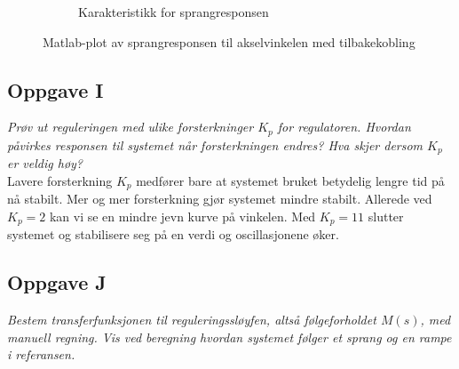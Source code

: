 \begin{figure}[h]
\begin{subfigure}[a]{0.450\textwidth}
		\caption{}{Karakteristikk for sprangresponsen}
		\label{fig:step_stable_char}
	\end{subfigure}
	\caption{Matlab-plot av sprangresponsen til akselvinkelen med tilbakekobling}
	\label{fig:step_stable}
\end{figure}

\subsection{Oppgave I}

\emph{Prøv ut reguleringen med ulike forsterkninger $K_p$ for regulatoren. Hvordan påvirkes
	responsen til systemet når forsterkningen endres? Hva skjer dersom $K_p$ er veldig høy?}\\

Lavere forsterkning $K_p$ medfører bare at systemet bruket betydelig lengre tid på nå stabilt. 
Mer og mer forsterkning gjør systemet mindre stabilt. Allerede ved $K_p = 2$ kan vi se en mindre jevn kurve på vinkelen. Med $K_p = 11$ slutter systemet og stabilisere seg på en verdi og oscillasjonene øker.

\subsection{Oppgave J}

\emph{Bestem transferfunksjonen til reguleringssløyfen, altså følgeforholdet $M(s)$, med manuell regning. Vis ved beregning hvordan systemet følger et sprang og en rampe i referansen.}


